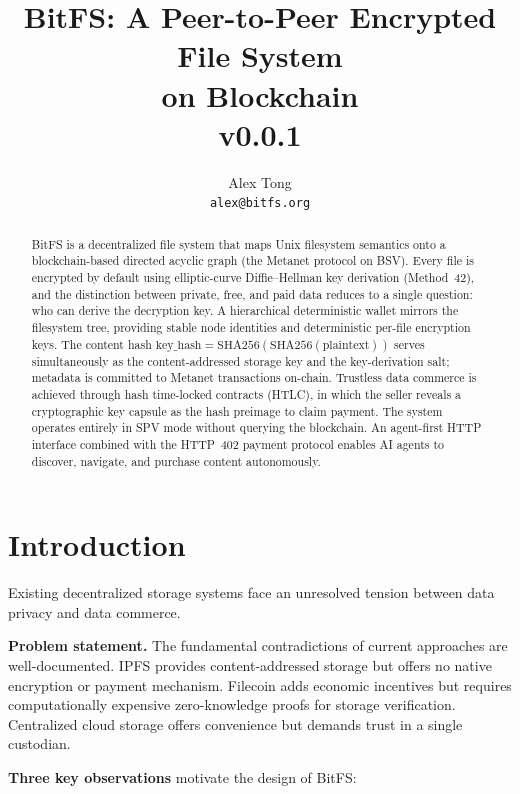 \documentclass[11pt,a4paper]{article}
\title{%
  \vspace{-1cm}
  \textbf{\LARGE BitFS: A Peer-to-Peer Encrypted File System\\on Blockchain}\\[0.5em]
  \large v0.0.1
}
\author{Alex Tong\\[0.3em]\texttt{alex@bitfs.org}}
\date{}
\begin{document}
\maketitle
\thispagestyle{fancy}

\begin{abstract}
BitFS is a decentralized file system that maps Unix filesystem semantics onto a blockchain-based directed acyclic graph (the Metanet protocol on BSV). Every file is encrypted by default using elliptic-curve Diffie--Hellman key derivation (Method~42), and the distinction between private, free, and paid data reduces to a single question: who can derive the decryption key. A hierarchical deterministic wallet mirrors the filesystem tree, providing stable node identities and deterministic per-file encryption keys. The content hash $\text{key\_hash} = \text{SHA256}(\text{SHA256}(\text{plaintext}))$ serves simultaneously as the content-addressed storage key and the key-derivation salt; metadata is committed to Metanet transactions on-chain. Trustless data commerce is achieved through hash time-locked contracts (HTLC), in which the seller reveals a cryptographic key capsule as the hash preimage to claim payment. The system operates entirely in SPV mode without querying the blockchain. An agent-first HTTP interface combined with the HTTP~402 payment protocol enables AI agents to discover, navigate, and purchase content autonomously.
\end{abstract}

\vspace{1em}
\tableofcontents
\vspace{1em}

\section{Introduction}

Existing decentralized storage systems face an unresolved tension between data privacy and data commerce.

\textbf{Problem statement.} The fundamental contradictions of current approaches are well-documented. IPFS provides content-addressed storage but offers no native encryption or payment mechanism. Filecoin adds economic incentives but requires computationally expensive zero-knowledge proofs for storage verification. Centralized cloud storage offers convenience but demands trust in a single custodian.

\textbf{Three key observations} motivate the design of BitFS:
\end{document}
